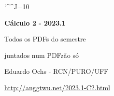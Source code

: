 \documentclass[oneside,12pt]{article}
\begin{document}

\def\u#1{\par{\footnotesize \url{#1}}}

\def\drafturl{http://anggtwu.net/LATEX/2023-1-C2.pdf}
\def\drafturl{http://anggtwu.net/2023.1-C2.html}
\def\draftfooter{\tiny \href{\drafturl}{\jobname{}} \ColorBrown{\shorttoday{} \hours}}

\catcode`\^^J=10
\pu



%

\thispagestyle{empty}

\begin{center}

\vspace*{1.2cm}

{\bf \Large Cálculo 2 - 2023.1}

\bsk

Todos os PDFs do semestre

juntados num PDFzão só

\bsk

Eduardo Ochs - RCN/PURO/UFF

\url{http://anggtwu.net/2023.1-C2.html}

\end{center}

\newpage



\end{document}
